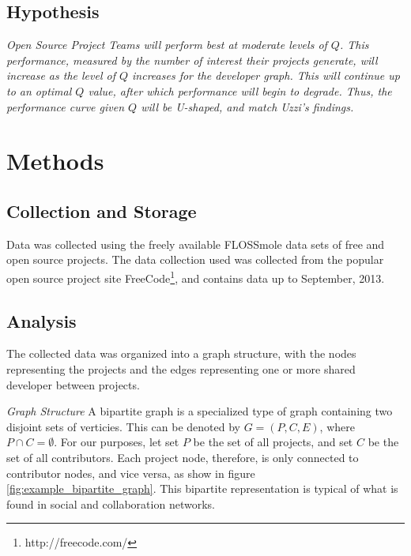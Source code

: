 \documentclass{proc}
\begin{document}
\subsection{Hypothesis}

\textit{Open Source Project Teams will perform best at moderate levels of $Q$. This performance, measured by the number of interest their projects generate, will increase as the level of $Q$ increases for the developer graph. This will continue up to an optimal $Q$ value, after which performance will begin to degrade. Thus, the performance curve given $Q$ will be U-shaped, and match Uzzi's findings\cite{uzzi2005collaboration}. }

\section{Methods}

\subsection{Collection and Storage}
Data was collected using the freely available FLOSSmole\cite{floss2006} data sets of free and open source projects. The data collection used was collected from the popular open source project site FreeCode\footnote{http://freecode.com/}, and contains data up to September, 2013.

\subsection{Analysis}
The collected data was organized into a graph structure, with the nodes representing the projects and the edges representing one or more shared developer between projects.


\textit{Graph Structure}
A bipartite graph is a specialized type of graph containing two disjoint sets of verticies. This can be denoted by ${G=(P,C,E)}$, where ${P \cap C = \emptyset}$. For our purposes, let set $P$ be the set of all projects, and set $C$ be the set of all contributors. Each project node, therefore, is only connected to contributor nodes, and vice versa, as show in figure \ref{fig:example_bipartite_graph}. This bipartite representation is typical of what is found in social and collaboration networks\cite{ramasco2004self}.
\end{document}
